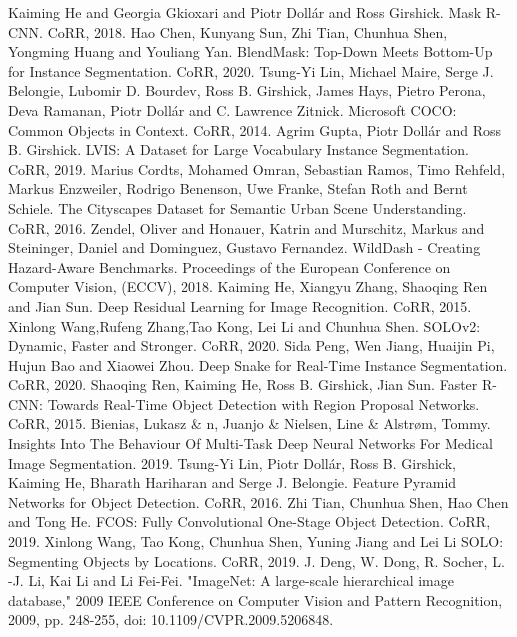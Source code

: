 \documentclass[10pt,twocolumn,letterpaper]{article}
\begin{document}
\begin{thebibliography}{1}
Kaiming He and Georgia Gkioxari and Piotr Dollár and Ross Girshick.
Mask R-CNN. CoRR, 2018.
Hao Chen, Kunyang Sun, Zhi Tian, Chunhua Shen, Yongming Huang and Youliang Yan.
BlendMask: Top-Down Meets Bottom-Up for Instance Segmentation. CoRR, 2020.
Tsung-Yi Lin, Michael Maire, Serge J. Belongie, Lubomir D. Bourdev, Ross B. Girshick, James Hays, Pietro Perona, Deva Ramanan, Piotr Doll\'ar and C. Lawrence Zitnick.
Microsoft COCO: Common Objects in Context. CoRR, 2014.
Agrim Gupta, Piotr Doll\'ar and Ross B. Girshick.
LVIS: A Dataset for Large Vocabulary Instance Segmentation. CoRR, 2019.
Marius Cordts, Mohamed Omran, Sebastian Ramos, Timo Rehfeld, Markus Enzweiler, Rodrigo Benenson, Uwe Franke, Stefan Roth and Bernt Schiele.
The Cityscapes Dataset for Semantic Urban Scene Understanding. CoRR, 2016.
Zendel, Oliver and Honauer, Katrin and Murschitz, Markus and Steininger, Daniel and Dominguez, Gustavo Fernandez.
WildDash - Creating Hazard-Aware Benchmarks. Proceedings of the European Conference on Computer Vision, (ECCV), 2018.
Kaiming He, Xiangyu Zhang, Shaoqing Ren and Jian Sun.
Deep Residual Learning for Image Recognition. CoRR, 2015.
Xinlong Wang,Rufeng Zhang,Tao Kong, Lei Li and Chunhua Shen.
SOLOv2: Dynamic, Faster and Stronger. CoRR, 2020.
Sida Peng, Wen Jiang, Huaijin Pi, Hujun Bao and Xiaowei Zhou.
Deep Snake for Real-Time Instance Segmentation. CoRR, 2020.
Shaoqing Ren, Kaiming He, Ross B. Girshick, Jian Sun.
Faster R-CNN: Towards Real-Time Object Detection with Region Proposal Networks. CoRR, 2015.
Bienias, Lukasz \& n, Juanjo \& Nielsen, Line \& Alstrøm, Tommy. Insights Into The Behaviour Of Multi-Task Deep Neural Networks For Medical Image Segmentation. 2019.
Tsung-Yi Lin, Piotr Doll\'ar, Ross B. Girshick, Kaiming He, Bharath Hariharan and Serge J. Belongie.
Feature Pyramid Networks for Object Detection. CoRR, 2016.
Zhi Tian, Chunhua Shen, Hao Chen and Tong He.
FCOS: Fully Convolutional One-Stage Object Detection. CoRR, 2019.
Xinlong Wang, Tao Kong, Chunhua Shen, Yuning Jiang and Lei Li
SOLO: Segmenting Objects by Locations. CoRR, 2019.
J. Deng, W. Dong, R. Socher, L. -J. Li, Kai Li and Li Fei-Fei.
"ImageNet: A large-scale hierarchical image database," 2009 IEEE Conference on Computer Vision and Pattern Recognition, 2009, pp. 248-255, doi: 10.1109/CVPR.2009.5206848.

\end{thebibliography}
\end{document}
